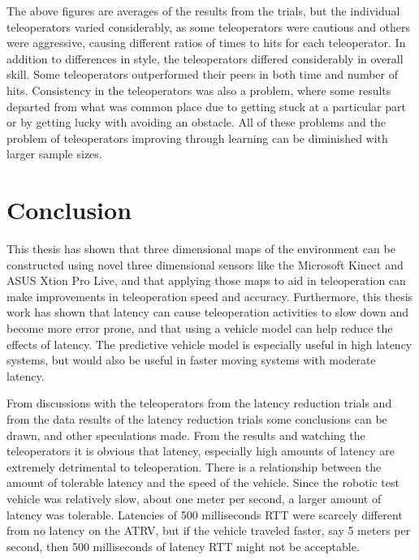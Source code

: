 \documentclass[12pt]{report}
\begin{document}
The above figures are averages of the results from the trials, but the individual teleoperators varied considerably, as some teleoperators were cautious and others were aggressive, causing different ratios of times to hits for each teleoperator.  In addition to differences in style, the teleoperators differed considerably in overall skill.  Some teleoperators outperformed their peers in both time and number of hits.  Consistency in the teleoperators was also a problem, where some results departed from what was common place due to getting stuck at a particular part or by getting lucky with avoiding an obstacle.  All of these problems and the problem of teleoperators improving through learning can be diminished with larger sample sizes.


\chapter{Conclusion}\label{chap:conclusion}
This thesis has shown that three dimensional maps of the environment can be constructed using novel three dimensional sensors like the Microsoft Kinect and ASUS Xtion Pro Live, and that applying those maps to aid in teleoperation can make improvements in teleoperation speed and accuracy.  Furthermore, this thesis work has shown that latency can cause teleoperation activities to slow down and become more error prone, and that using a vehicle model can help reduce the effects of latency.  The predictive vehicle model is especially useful in high latency systems, but would also be useful in faster moving systems with moderate latency.

From discussions with the teleoperators from the latency reduction trials and from the data results of the latency reduction trials some conclusions can be drawn, and other speculations made.  From the results and watching the teleoperators it is obvious that latency, especially high amounts of latency are extremely detrimental to teleoperation.  There is a relationship between the amount of tolerable latency and the speed of the vehicle.  Since the robotic test vehicle was relatively slow, about one meter per second, a larger amount of latency was tolerable.  Latencies of 500 milliseconds RTT were scarcely different from no latency on the ATRV, but if the vehicle traveled faster, say 5 meters per second, then 500 milliseconds of latency RTT might not be acceptable.
\end{document}
